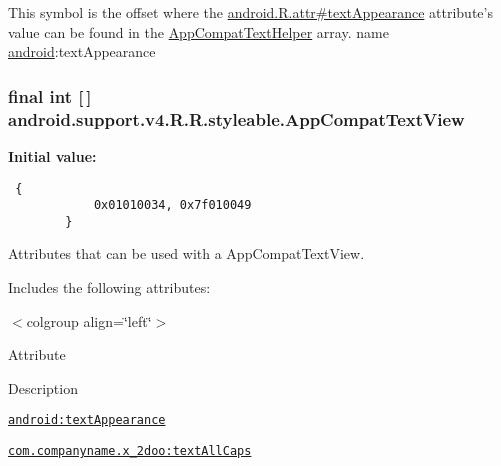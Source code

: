 This symbol is the offset where the \hyperlink{}{android.R.attr\#textAppearance} attribute's value can be found in the \hyperlink{classandroid_1_1support_1_1v4_1_1_r_1_1styleable_4b08e16e18a4842ae56614fdc42afc26}{AppCompatTextHelper} array.  name \hyperlink{namespaceandroid}{android}:textAppearance \hypertarget{classandroid_1_1support_1_1v4_1_1_r_1_1styleable_2000bab6df68054d5e2a8e1f43e47fc8}{
\subsubsection[{AppCompatTextView}]{\setlength{\rightskip}{0pt plus 5cm}final int \mbox{[}$\,$\mbox{]} android.support.v4.R.R.styleable.AppCompatTextView}}
\label{classandroid_1_1support_1_1v4_1_1_r_1_1styleable_2000bab6df68054d5e2a8e1f43e47fc8}


\textbf{Initial value:}

\begin{Code}\begin{verbatim} {
            0x01010034, 0x7f010049
        }
\end{verbatim}
\end{Code}
Attributes that can be used with a AppCompatTextView. 

Includes the following attributes: \begin{TabularC}{0}
\hline
\end{TabularC}
$<$colgroup align=\char`\"{}left\char`\"{}$>$ 

Attribute

Description 

{\tt \hyperlink{classandroid_1_1support_1_1v4_1_1_r_1_1styleable_2d9b7b115f3b8c8fd3fd2393e77a2fc0}{android:textAppearance}}

{\tt \hyperlink{classandroid_1_1support_1_1v4_1_1_r_1_1styleable_e0710b843567b5d6b3777bcbd6456ac4}{com.companyname.x\_\-2doo:textAllCaps}}

